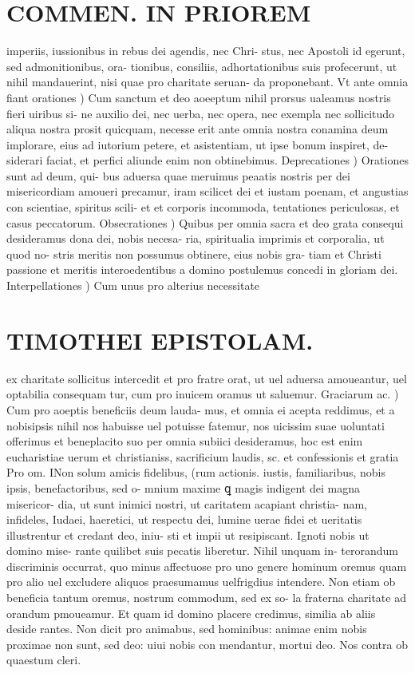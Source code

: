 \documentclass{article}
\begin{document}
\begin{pages}
\section*{COMMEN. IN PRIOREM }
\marginpar{[ p.42 ]}\pstart imperiis, iussionibus in rebus dei agendis, nec Chri- stus, nec Apostoli id egerunt, sed admonitionibus, ora- tionibus, consiliis, adhortationibus suis profecerunt, ut nihil mandauerint, nisi quae pro charitate seruan- da proponebant.  \pend\pstart Vt ante omnia fiant orationes ) Cum sanctum et deo aoeeptum nihil prorsus ualeamus nostris fieri uiribus si- ne auxilio dei, nec uerba, nec opera, nec exempla nec sollicitudo aliqua nostra prosit quicquam, necesse erit ante omnia nostra conamina deum implorare, eius ad iutorium petere, et asistentiam, ut ipse bonum inspiret, de- siderari faciat, et perfici aliunde enim non obtinebimus.  \pend\pstart Deprecationes ) Orationes sunt ad deum, qui- bus aduersa quae meruimus peaatis nostris per dei misericordiam amoueri precamur, iram scilicet dei et iustam poenam, et angustias con scientiae, spiritus scili- et et corporis incommoda, tentationes periculosas, et casus peccatorum.  \pend\pstart Obsecrationes ) Quibus per omnia sacra et deo grata consequi desideramus dona dei, nobis necesa- ria, spiritualia imprimis et corporalia, ut quod no- stris meritis non possumus obtinere, eius nobis gra- tiam et Christi passione et meritis interoedentibus a domino postulemus concedi in gloriam dei.  \pend\pstart Interpellationes ) Cum unus pro alterius necessitate  \pend
\section*{TIMOTHEI EPISTOLAM. }
\marginpar{[ p.43 ]}\pstart ex charitate sollicitus intercedit et pro fratre orat, ut uel aduersa amoueantur, uel optabilia consequam tur, cum pro inuicem oramus ut saluemur. Graciarum ac. ) Cum pro aoeptis beneficiis deum lauda- mus, et omnia ei acepta reddimus, et a nobisipsis nihil nos habuisse uel potuisse fatemur, nos uicissim suae uoluntati offerimus et beneplacito suo per omnia subiici desideramus, hoc est enim eucharistiae uerum et christianiss, sacrificium laudis, sc. et confessionis et gratia Pro om. INon solum amicis fidelibus, (rum actionis. iustis, familiaribus, nobis ipsis, benefactoribus, sed o- mnium maxime ꝗ magis indigent dei magna misericor- dia, ut sunt inimici nostri, ut caritatem acapiant christia- nam, infideles, Iudaei, haeretici, ut respectu dei, lumine uerae fidei et ueritatis illustrentur et credant deo, iniu- sti et impii ut resipiscant. Ignoti nobis ut domino mise- rante quilibet suis pecatis liberetur. Nihil unquam in- terorandum discriminis occurrat, quo minus affectuose pro uno genere hominum oremus quam pro alio uel excludere aliquos praesumamus uelfrigdius intendere. Non etiam ob beneficia tantum oremus, nostrum commodum, sed ex so- la fraterna charitate ad orandum pmoueamur. Et quam id domino placere credimus, similia ab aliis deside rantes. Non dicit pro animabus, sed hominibus: animae enim nobis proximae non sunt, sed deo: uiui nobis con mendantur, mortui deo. Nos contra ob quaestum cleri.  \pend

\end{pages}
\end{document}

